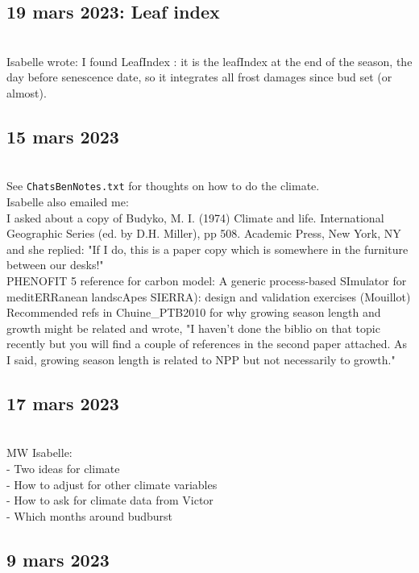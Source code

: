 \documentclass[11pt,letter]{article}
\begin{document}
\subsection{19 mars 2023: Leaf index}\\

Isabelle wrote: I found LeafIndex : it is the leafIndex at the end of the season, the day before senescence date, so it integrates all frost damages since bud set (or almost).

\subsection{15 mars 2023}\\

See \verb|ChatsBenNotes.txt| for thoughts on how to do the climate.\\

Isabelle also emailed me:\\
I asked about a copy of Budyko, M. I. (1974) Climate and life. International Geographic Series (ed. by D.H. Miller), pp 508. Academic Press, New York, NY and she replied: "If I do, this is a paper copy which is somewhere in the furniture between our desks!"\\

PHENOFIT 5 reference for carbon model: A generic process-based SImulator for meditERRanean landscApes SIERRA): design and validation exercises (Mouillot)\\

Recommended refs in Chuine\_PTB2010 for why growing season length and growth might be related and wrote, "I haven’t done the biblio on that topic recently but you will find a couple of references in the second paper attached. As I said, growing season length is related to NPP but not necessarily to growth."

\subsection{17 mars 2023}\\

MW Isabelle:\\
- Two ideas for climate\\
- How to adjust for other climate variables\\
- How to ask for climate data from Victor \\
- Which months around budburst \\

\subsection{9 mars 2023}
\end{document}
